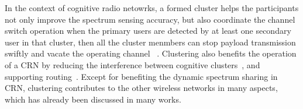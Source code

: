 \documentclass[10pt,journal,compsoc]{IEEEtran}
\theoremstyle{mytheoremstyle}
\theoremstyle{mytheoremstyle}
\theoremstyle{mytheoremstyle}
\newcommand{\ie}{i.e., }
\begin{document}
In the context of cognitive radio netowrks, a formed cluster helps the participants not only improve the spectrum sensing accuracy, but also coordinate the channel switch operation when the primary users are detected by at least one secondary user in that cluster, then all the cluster menmbers can stop payload transmission swiftly and vacate the operating channel ~\cite{willkomm08}.
Clustering also benefits the operation of a CRN by reducing the interference between cognitive clusters~\cite{centralizedSharing80222}, and supporting routing~\cite{Abbasi_survey_07}.
Except for benefiting the dynamic spectrum sharing in CRN, clustering contributes to the other wireless networks in many aspects, which has already been discussed in many works.

\end{document}
